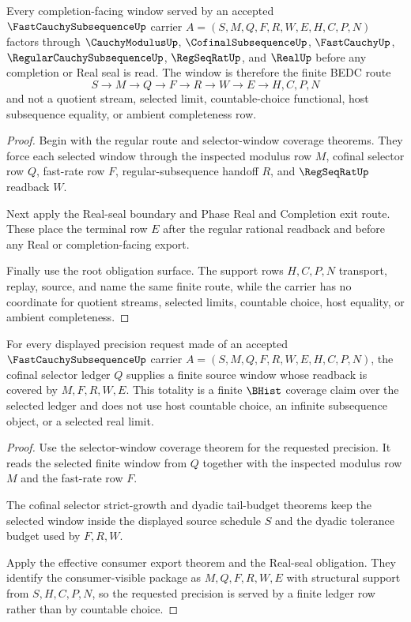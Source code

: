 \begin{theorem}
\label{thm:fast-cauchy-subsequence-choice-free-completion-window}
Every completion-facing window served by an accepted $\FastCauchySubsequenceUp$ carrier $A=(S,M,Q,F,R,W,E,H,C,P,N)$ factors through $\CauchyModulusUp$, $\CofinalSubsequenceUp$, $\FastCauchyUp$, $\RegularCauchySubsequenceUp$, $\RegSeqRatUp$, and $\RealUp$ before any completion or Real seal is read. The window is therefore the finite BEDC route
$$
S \to M \to Q \to F \to R \to W \to E \to H,C,P,N
$$
and not a quotient stream, selected limit, countable-choice functional, host subsequence equality, or ambient completeness row.
\end{theorem}
\begin{proof}
Begin with the regular route and selector-window coverage theorems. They force each selected window through the inspected modulus row $M$, cofinal selector row $Q$, fast-rate row $F$, regular-subsequence handoff $R$, and $\RegSeqRatUp$ readback $W$.

Next apply the Real-seal boundary and Phase Real and Completion exit route. These place the terminal row $E$ after the regular rational readback and before any Real or completion-facing export.

Finally use the root obligation surface. The support rows $H,C,P,N$ transport, replay, source, and name the same finite route, while the carrier has no coordinate for quotient streams, selected limits, countable choice, host equality, or ambient completeness.
\end{proof}

\begin{theorem}
\label{thm:fast-cauchy-subsequence-cofinal-selector-totality}
For every displayed precision request made of an accepted $\FastCauchySubsequenceUp$ carrier $A=(S,M,Q,F,R,W,E,H,C,P,N)$, the cofinal selector ledger $Q$ supplies a finite source window whose readback is covered by $M,F,R,W,E$. This totality is a finite $\BHist$ coverage claim over the selected ledger and does not use host countable choice, an infinite subsequence object, or a selected real limit.
\end{theorem}
\begin{proof}
Use the selector-window coverage theorem for the requested precision. It reads the selected finite window from $Q$ together with the inspected modulus row $M$ and the fast-rate row $F$.

The cofinal selector strict-growth and dyadic tail-budget theorems keep the selected window inside the displayed source schedule $S$ and the dyadic tolerance budget used by $F,R,W$.

Apply the effective consumer export theorem and the Real-seal obligation. They identify the consumer-visible package as $M,Q,F,R,W,E$ with structural support from $S,H,C,P,N$, so the requested precision is served by a finite ledger row rather than by countable choice.
\end{proof}

